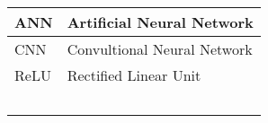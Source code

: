 



\begin{longtable}{p{90pt}l}
\hline ANN    	&\vline  Artificial Neural Network \\
\hline CNN      &\vline  Convultional Neural Network \\
\hline ReLU     &\vline  Rectified Linear Unit \\
\hline 
\
\end{longtable}






